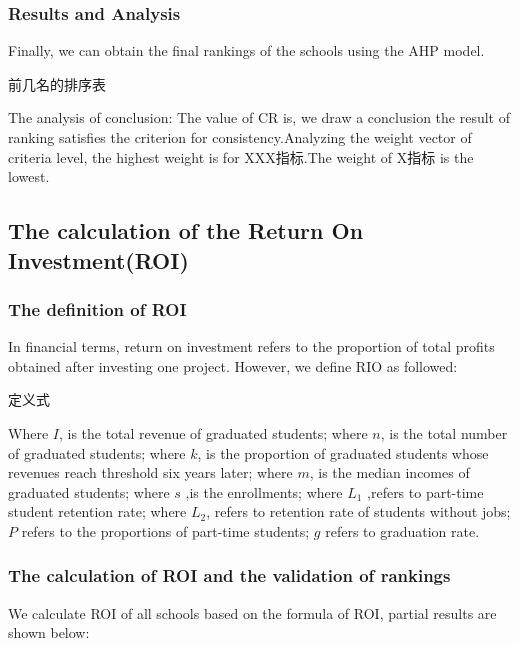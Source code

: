 \subsubsection{Results and Analysis}
Finally, we can obtain the final rankings of the schools using the AHP model.

前几名的排序表

The analysis of conclusion:
The value of CR is, we draw a conclusion the result of ranking satisfies the criterion for consistency.Analyzing the weight vector of criteria level, the highest weight is for XXX指标.The weight of X指标 is the lowest.

\subsection{The calculation of the Return On Investment(ROI)}
\subsubsection{The definition of ROI}
In financial terms, return on investment refers to the proportion of total profits obtained after investing one project. However, we define RIO as followed:

定义式

Where $I$, is the total revenue of graduated students; 
where $n$, is the total number of graduated students; 
where $k$, is the proportion of graduated students whose revenues reach threshold six years later; 
where $m$, is the median incomes of graduated students; 
where $s$ ,is the enrollments; 
where $L_1$ ,refers to part-time student retention rate; 
where $L_2$, refers to retention rate of students without jobs; 
$P$ refers to the proportions of part-time students; 
$g$ refers to graduation rate.

\subsubsection{The calculation of ROI and the validation of rankings}
We calculate ROI of all schools based on the formula of ROI, partial results are shown below:

